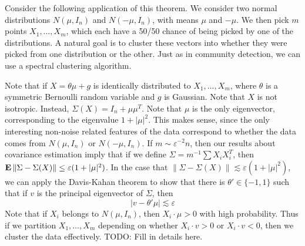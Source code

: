 Consider the following application of this theorem. We consider two normal distributions $N(\mu,I_n)$ and $N(-\mu,I_n)$, with means $\mu$ and $-\mu$. We then pick $m$ points $X_1, \dots, X_m$, which each have a 50/50 chance of being picked by one of the distributions. A natural goal is to cluster these vectors into whether they were picked from one distribution or the other. Just as in community detection, we can use a spectral clustering algorithm.

Note that if $X = \theta \mu + g$ is identically distributed to $X_1, \dots, X_m$, where $\theta$ is a symmetric Bernoulli random variable and $g$ is Gaussian. Note that $X$ is not isotropic. Instead, $\Sigma(X) = I_n + \mu \mu^T$. Note that $\mu$ is the only eigenvector, corresponding to the eigenvalue $1 + |\mu|^2$. This makes sense, since the only interesting non-noise related features of the data correspond to whether the data comes from $N(\mu,I_n)$ or $N(-\mu,I_n)$. If $m \sim \varepsilon^{-2} n$, then our results about covariance estimation imply that if we define $\Sigma = m^{-1} \sum X_i X_i^T$, then $\operatorname{\mathbf{E}} \| \Sigma - \Sigma(X) \| \leq \varepsilon (1 + |\mu|^2)$. In the case that $\| \Sigma - \Sigma(X) \| \lesssim \varepsilon (1 + |\mu|^2)$, we can apply the Davis-Kahan theorem to show that there is $\theta' \in \{ -1 , 1 \}$ such that if $v$ is the principal eigenvector of $\Sigma$, then
%
\[ |v - \theta' \mu| \lesssim \varepsilon \]
%
Note that if $X_i$ belongs to $N(\mu,I_n)$, then $X_i \cdot \mu > 0$ with high probability. Thus if we partition $X_1, \dots, X_m$ depending on whether $X_i \cdot v > 0$ or $X_i \cdot v < 0$, then we cluster the data effectively. TODO: Fill in details here.






